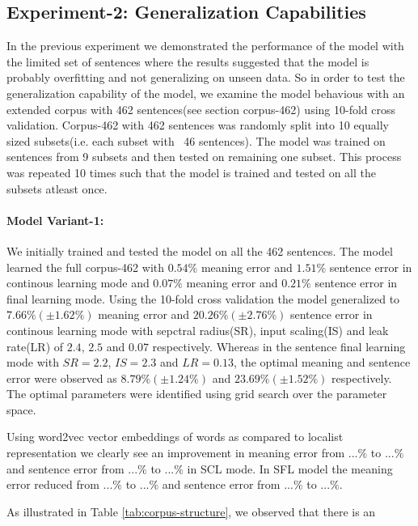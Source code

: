 \subsection{Experiment-2: Generalization Capabilities} \label{exp-2}

In the previous experiment we demonstrated the performance of the model with the limited set of sentences where the results suggested that the model is probably overfitting and not generalizing on unseen data. So in order to test the generalization capability of the model, we examine the model behavious with an extended corpus with 462 sentences(see section corpus-462) using 10-fold cross validation. Corpus-462 with 462 sentences was randomly split into 10 equally sized subsets(i.e. each subset with ~46 sentences). The model was trained on sentences from 9 subsets and then tested on remaining one subset. This process was repeated 10 times such that the model is trained and tested on all the subsets atleast once. 

\paragraph{Model Variant-1:} We initially trained and tested the model on all the 462 sentences. The model learned the full corpus-462 with $0.54\%$ meaning error and $1.51\%$ sentence error in continous learning mode and $0.07\%$ meaning error and $0.21\%$ sentence error in final learning mode. Using the 10-fold cross validation the model generalized to $7.66\% (\pm 1.62\%) $ meaning error and $20.26\% (\pm 2.76\%)$ sentence error in continous learning mode with sepctral radius(SR), input scaling(IS) and leak rate(LR) of $2.4$, $2.5$ and $0.07$ respectively. Whereas in the sentence final learning mode with $SR=2.2$, $IS=2.3$ and $LR=0.13$, the optimal meaning and sentence error were observed as $8.79\% (\pm 1.24\%)$ and $23.69\% (\pm 1.52\%)$ respectively. The optimal parameters were identified using grid search over the parameter space. 

	Using word2vec vector embeddings of words as compared to localist representation we clearly see an improvement in meaning error from $... \%$ to $... \%$ and sentence error from $... \%$ to $... \%$ in SCL mode. In SFL model the meaning error reduced from  $...\%$ to $...\%$ and sentence error from $...\%$ to $...\%$.
	
As illustrated in Table \ref{tab:corpus-structure}, we observed that there is an %

